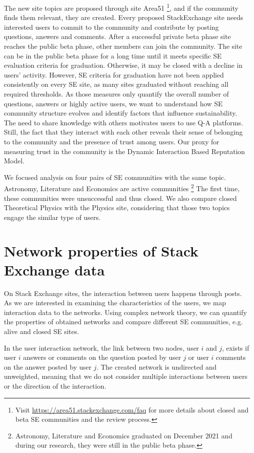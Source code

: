 The new site topics are proposed through site Area51 \footnote{Visit \url{https://area51.stackexchange.com/faq} for more details about closed and beta SE communities and the review process.}, and if the community finds them relevant, they are created. Every proposed  StackExchange site needs interested users to commit to the community and contribute by posting questions, answers and comments. After a successful private beta phase site reaches the public beta phase, other members can join the community. The site can be in the public beta phase for a long time until it meets specific SE evaluation criteria for graduation. Otherwise, it may be closed with a decline in users’ activity. However, SE criteria for graduation have not been applied consistently on every SE site, as many sites graduated without reaching all required thresholds. As those measures only quantify the overall number of questions, answers or highly active users, we want to understand how SE community structure evolves and identify factors that influence sustainability. The need to share knowledge with others motivates users to use Q-A platforms. Still, the fact that they interact with each other reveals their sense of belonging to the community and the presence of trust among users. Our proxy for measuring trust in the community is the Dynamic Interaction Based Reputation Model.

We focused analysis on four pairs of SE communities with the same topic. Astronomy, Literature and Economics are active communities \footnote{Astronomy, Literature and Economics graduated on December 2021 and during our research, they were still in the public beta phase.} The first time, these communities were unsuccessful and thus closed. We also compare closed Theoretical Physics with the Physics site, considering that those two topics engage the similar type of users. 

\section{Network properties of Stack Exchange data}

On Stack Exchange sites, the interaction between users happens through posts. As we are interested in examining the characteristics of the users, we map interaction data to the networks. Using complex network theory, we can quantify the properties of obtained networks and compare different SE communities, e.g. alive and closed SE sites. 

In the user interaction network, the link between two nodes, user $i$ and $j$, exists if user $i$ answers or comments on the question posted by user $j$ or user $i$ comments on the answer posted by user $j$. The created network is undirected and unweighted, meaning that we do not consider multiple interactions between users or the direction of the interaction. 

